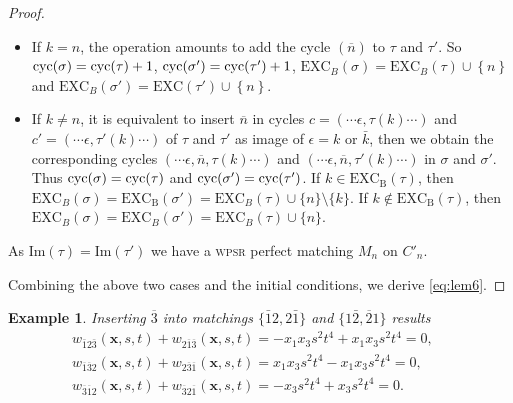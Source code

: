 \documentclass[12pt,reqno]{amsart}
\numberwithin{equation}{section}
\newcommand\cyc{\mathop{ \rm cyc}}
\newcounter{num}
\def\x{\mathbf{ x}}
\def\cyc{\mathop{\rm cyc}}
\newtheorem{example}{Example}
\begin{document}
\begin{proof}
\begin{enumerate}
\begin{itemize}
\item If $k=n$, the operation amounts to add the cycle $(\overline{n})$ to $\tau$ and $\tau'$. 
So $\cyc(\sigma)=\cyc(\tau)+1$, $\cyc(\sigma')=\cyc(\tau')+1$, $\mathrm{EXC}_B(\sigma)=\mathrm{EXC}_B(\tau)\cup\left\{n\right\}$
and $\mathrm{EXC}_B(\sigma')=\mathrm{EXC}(\tau')\cup\left\{n \right\}$.\\

\item If $k\neq n$, it is equivalent to insert $\overline{n}$ in cycles $c=(\cdots \epsilon, \tau(k)\cdots)$ and $c'=(\cdots \epsilon, \tau'(k)\cdots)$ of $\tau$ and $\tau'$ as image of $\epsilon =k$ or $\bar k$, 
then we obtain the corresponding cycles
$(\cdots \epsilon, \overline{n}, \tau(k)\cdots)$ and $(\cdots \epsilon, \overline{n}, \tau'(k)\cdots)$
in $\sigma$ and $\sigma'$. 
Thus $\cyc(\sigma)=\cyc(\tau)$ and $\cyc(\sigma')=\cyc(\tau')$.
If $k\in\mathrm{EXC_B}(\tau)$, then 
$\mathrm{EXC}_B(\sigma)=\mathrm{EXC_B}(\sigma')=\mathrm{EXC}_B(\tau)\cup\{n\}\setminus\{k\}$.
If $k\notin\mathrm{EXC_B}(\tau)$, 
then $\mathrm{EXC}_B(\sigma)=\mathrm{EXC}_B(\sigma')=\mathrm{EXC}_B(\tau)\cup\{n\}$.
\end{itemize} 
As $\mathrm{Im}(\tau)=\mathrm{Im}(\tau')$ we have a \textsc{wpsr} perfect matching $M_n$ on $C'_n$.
\end{enumerate}

Combining  the above two cases  and the initial conditions, we derive \eqref{eq:lem6}.
\end{proof}

\begin{example}
Inserting $\overline{3}$ into matchings 
$\{\bar{1}2, 2\bar{1}\}$ and  $
\{1\bar{2}, \overline{2}1\}$
results 
\begin{equation*}
	\begin{array}{lr}
		w_{\bar{1}2\bar{3}}(\x,s,t)+w_{2\overline{1}\overline{3}}(\x,s,t)=-x_1x_3s^2t^4+x_1x_3s^2t^4=0,&\\
		w_{\overline{1}\overline{3}2}(\x,s,t)+w_{2\overline{3}\overline{1}}(\x,s,t)=x_1x_3s^2t^4-x_1x_3s^2t^4=0,&\\
		w_{\overline{3}\overline{1}2}(\x,s,t)+w_{\overline{3}2\overline{1}}(\x,s,t)=-x_3s^2t^4+x_3s^2t^4=0.&\
	\end{array}
\end{equation*}
\end{example}
\end{document}
